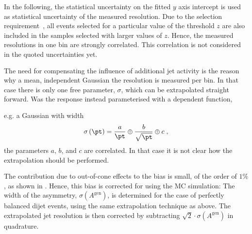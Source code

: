 In the following, the statistical uncertainty on the fitted $y$ axis
intercept is used as statistical uncertainty of the measured resolution.
Due to the selection requirement~,
all events selected for a particular value of the threshold $z$ are
also included in the samples selected with larger values of $z$.
Hence, the measured resolutions in one \ptave bin are strongly correlated.
This correlation is not considered in the quoted uncertainties yet.

The need for compensating the influence of additional jet activity is
the reason why a mean, \pt independent Gaussian the resolution is
measured per \ptave bin.
In that case there is only one free parameter, $\sigma$, which can be
extrapolated straight forward.
Was the response instead parameterised with a \pt dependent function,

e.g. a Gaussian with width
\begin{equation*}
  \sigma\left(\pt\right) = \frac{a}{\pt} \oplus \frac{b}{\sqrt{\pt}}
  \oplus c \;,
\end{equation*}
the parameters $a$, $b$, and $c$ are correlated.
In that case it is not clear how the extrapolation should be performed.

The contribution due to out-of-cone effects to the bias is small, of
the order of $1\%$, as shown in
.
Hence, this bias is corrected for using the MC simulation:
The width of the \ptgen asymmetry, $\sigma(A^{\text{gen}})$, is determined for the
 case of perfectly balanced dijet events, using the
same extrapolation technique as above.
The extrapolated jet \pt resolution is then corrected by 
subtracting $\sqrt{2}\cdot\sigma(A^{\text{gen}})$ in quadrature.

